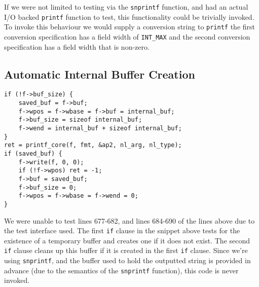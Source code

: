 \documentclass[12pt]{article}
\begin{document}
If we were not limited to testing via the \verb|snprintf| function, and had
an actual I/O backed \verb|printf| function to test, this functionality could be
trivially invoked. To invoke this behaviour we would supply a conversion
string to \verb|printf| the first conversion specification has a 
field width of \verb|INT_MAX|
and the second conversion specification has a field width that is non-zero.

\subsection{Automatic Internal Buffer Creation}
\begin{lstlisting}[firstnumber=677]
if (!f->buf_size) {
    saved_buf = f->buf;
    f->wpos = f->wbase = f->buf = internal_buf;
    f->buf_size = sizeof internal_buf;
    f->wend = internal_buf + sizeof internal_buf;
}
ret = printf_core(f, fmt, &ap2, nl_arg, nl_type);
if (saved_buf) {
    f->write(f, 0, 0);
    if (!f->wpos) ret = -1;
    f->buf = saved_buf;
    f->buf_size = 0;
    f->wpos = f->wbase = f->wend = 0;
}
\end{lstlisting}

We were unable to test lines 677-682, and lines 684-690 of the lines above
due to the test interface used. The first \verb|if| clause in the snippet above
tests for the existence of a temporary buffer and creates one if it does not
exist. The second \verb|if| clause cleans up this buffer if it is created in
the first \verb|if| clause. Since we're using \verb|snprintf|, and the buffer used
to hold the outputted string is provided in advance (due to the semantics of the 
\verb|snprintf| function), this code is never invoked. 
\end{document}
